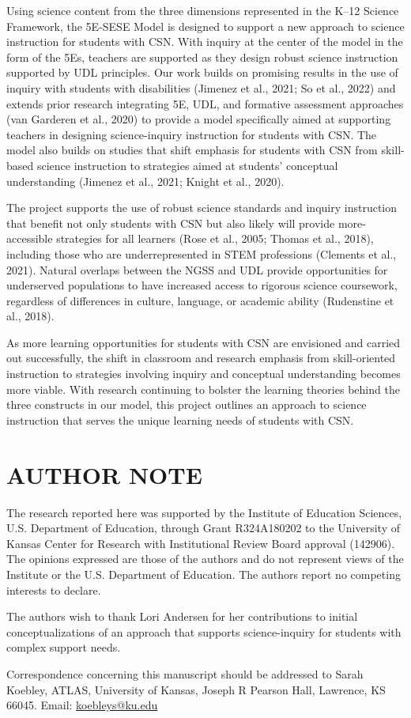 \documentclass[11.5pt]{sig-alternate} %
\begin{document}
\begin{large}
Using science content from the three dimensions represented in the K–12 Science Framework, the 5E-SESE Model is designed to support a new approach to science instruction for students with CSN. With inquiry at the center of the model in the form of the 5Es, teachers are supported as they design robust science instruction supported by UDL principles. Our work builds on promising results in the use of inquiry with students with disabilities (Jimenez et al., 2021; So et al., 2022) and extends prior research integrating 5E, UDL, and formative assessment approaches (van Garderen et al., 2020) to provide a model specifically aimed at supporting teachers in designing science-inquiry instruction for students with CSN. The model also builds on studies that shift emphasis for students with CSN from skill-based science instruction to strategies aimed at students’ conceptual understanding (Jimenez et al., 2021; Knight et al., 2020).

The project supports the use of robust science standards and inquiry instruction that benefit not only students with CSN but also likely will provide more-accessible strategies for all learners (Rose et al., 2005; Thomas et al., 2018), including those who are underrepresented in STEM professions (Clements et al., 2021). Natural overlaps between the NGSS and UDL provide opportunities for underserved populations to have increased access to rigorous science coursework, regardless of differences in culture, language, or academic ability (Rudenstine et al., 2018).

As more learning opportunities for students with CSN are envisioned and carried out successfully, the shift in classroom and research emphasis from skill-oriented instruction to strategies involving inquiry and conceptual understanding becomes more viable. With research continuing to bolster the learning theories behind the three constructs in our model, this project outlines an approach to science instruction that serves the unique learning needs of students with CSN.

\section*{AUTHOR NOTE}

The research reported here was supported by the Institute of Education Sciences, U.S. Department of Education, through Grant R324A180202 to the University of Kansas Center for Research with Institutional Review Board approval (142906). The opinions expressed are those of the authors and do not represent views of the Institute or the U.S. Department of Education. The authors report no competing interests to declare.

The authors wish to thank Lori Andersen for her contributions to initial conceptualizations of an approach that supports science-inquiry for students with complex support needs.

Correspondence concerning this manuscript should be addressed to Sarah Koebley, ATLAS, University of Kansas, Joseph R Pearson Hall, Lawrence, KS 66045. Email: \href{mailto:koebleys@ku.edu}{koebleys@ku.edu}


\end{large}
\clearpage
\end{document}
